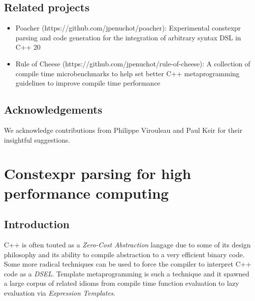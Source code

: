 \documentclass[english,12pt,a4paper]{book}
\providecommand{\cpp}{\textsc{C++}\xspace}
\providecommand{\dsels}{\textit{DSEL}s\xspace}
\providecommand{\dsel}{\textit{DSEL}\xspace}
\begin{document}
\section{Related projects} %

\begin{itemize}

\item Poacher (https://github.com/jpenuchot/poacher): Experimental constexpr
      parsing and code generation for the integration of arbitrary syntax DSL in
      \cpp20

\item Rule of Cheese (https://github.com/jpenuchot/rule-of-cheese):
      A collection of compile time microbenchmarks to help set better
      \cpp metaprogramming guidelines to improve compile time performance
\end{itemize}

\section{Acknowledgements}

We acknowledge contributions from Philippe Virouleau and Paul Keir for their
insightful suggestions.

\chapter{
  Constexpr parsing for high performance computing
}

\section{Introduction}

\cpp is often touted as a \textit{Zero-Cost Abstraction} langage due to some of
its design philosophy and its ability to compile abstraction to a very efficient
binary code. Some more radical techniques can be used to force the compiler to
interpret \cpp code as a \dsel. Template metaprogramming is such a technique
and it spawned a large corpus of related idioms from compile time function
evaluation to lazy evaluation via \textit{Expression Templates}.
\end{document}
